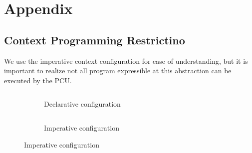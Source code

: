 \chapter{Appendix}

\section{Context Programming Restrictino}

We use the imperative context configuration for ease of understanding, but it is important to
realize not all program expressible at this abstraction can be executed by the PCU.

\begin{figure}
  \begin{subfigure}[b]{0.5\textwidth}
    \inputminted{python}{code/dotproduct.py}
    \caption{Declarative configuration}
  \end{subfigure}
  \hfill
  \begin{subfigure}[b]{0.4\textwidth}
    \inputminted{python}{code/context_imp.py}
    \caption{Imperative configuration}
  \end{subfigure}
\end{figure}
